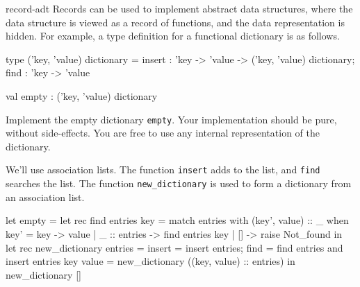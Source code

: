 %
\begin{exercise}{record-adt}
Records can be used to implement abstract data structures, where the data structure is viewed as
a record of functions, and the data representation is hidden.  For example, a type definition for a
functional dictionary is as follows.

\begin{ocaml}
type ('key, 'value) dictionary =
   { insert : 'key -> 'value -> ('key, 'value) dictionary;
     find   : 'key -> 'value
   }

val empty : ('key, 'value) dictionary
\end{ocaml}
%
Implement the empty dictionary \hbox{\lstinline/empty/}.  Your implementation should be pure, without side-effects.
You are free to use any internal representation of the dictionary.

\begin{answer}\ifanswers
We'll use association lists.  The function \hbox{\lstinline/insert/} adds to the list, and \hbox{\lstinline/find/}
searches the list.  The function \hbox{\lstinline/new_dictionary/} is used to form a dictionary from
an association list.

\begin{ocaml}
let empty =
   let rec find entries key =
      match entries with
         (key', value) :: _ when key' = key -> value
       | _ :: entries -> find entries key
       | [] -> raise Not_found
   in
   let rec new_dictionary entries =
      { insert = insert entries;
        find = find entries
      }
   and insert entries key value =
      new_dictionary ((key, value) :: entries)
   in
   new_dictionary []
\end{ocaml}
\fi\end{answer}
\end{exercise}

